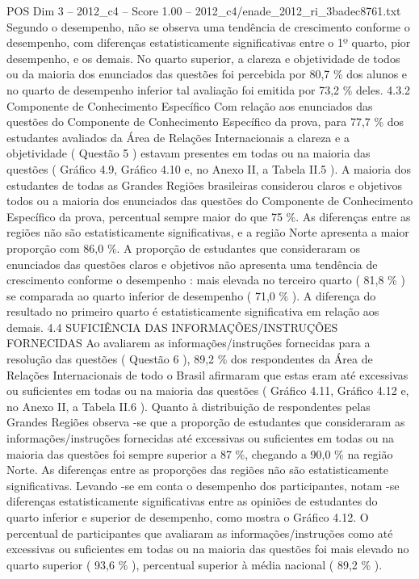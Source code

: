 \begin{textsample}{POS Dim 3 – 2012\_c4 – Score 1.00 – 2012\_c4/enade\_2012\_ri\_3badec8761.txt}
Segundo o desempenho, não se observa uma tendência de crescimento conforme o desempenho, com diferenças estatisticamente significativas entre o 1º quarto, pior desempenho, e os demais.
No quarto superior, a clareza e objetividade de todos ou da maioria dos enunciados das questões foi percebida por 80,7 \% dos alunos e no quarto de desempenho inferior tal avaliação foi emitida por 73,2 \% deles. 4.3.2 Componente de Conhecimento Específico Com relação aos enunciados das questões do Componente de Conhecimento Específico da prova, para 77,7 \% dos estudantes avaliados da Área de Relações Internacionais a clareza e a objetividade ( Questão 5 ) estavam presentes em todas ou na maioria das questões ( Gráfico 4.9, Gráfico 4.10 e, no Anexo II, a Tabela II.5 ).
A maioria dos estudantes de todas as Grandes Regiões brasileiras considerou claros e objetivos todos ou a maioria dos enunciados das questões do Componente de Conhecimento Específico da prova, percentual sempre maior do que 75 \%.
As diferenças entre as regiões não são estatisticamente significativas, e a região Norte apresenta a maior proporção com 86,0 \%.
A proporção de estudantes que consideraram os enunciados das questões claros e objetivos não apresenta uma tendência de crescimento conforme o desempenho : mais elevada no terceiro quarto ( 81,8 \% ) se comparada ao quarto inferior de desempenho ( 71,0 \% ).
A diferença do resultado no primeiro quarto é estatisticamente significativa em relação aos demais. 4.4 SUFICIÊNCIA DAS INFORMAÇÕES/INSTRUÇÕES FORNECIDAS Ao avaliarem as informações/instruções fornecidas para a resolução das questões ( Questão 6 ), 89,2 \% dos respondentes da Área de Relações Internacionais de todo o Brasil afirmaram que estas eram até excessivas ou suficientes em todas ou na maioria das questões ( Gráfico 4.11, Gráfico 4.12 e, no Anexo II, a Tabela II.6 ).
Quanto à distribuição de respondentes pelas Grandes Regiões observa -se que a proporção de estudantes que consideraram as informações/instruções fornecidas até excessivas ou suficientes em todas ou na maioria das questões foi sempre superior a 87 \%, chegando a 90,0 \% na região Norte.
As diferenças entre as proporções das regiões não são estatisticamente significativas.
Levando -se em conta o desempenho dos participantes, notam -se diferenças estatisticamente significativas entre as opiniões de estudantes do quarto inferior e superior de desempenho, como mostra o Gráfico 4.12.
O percentual de participantes que avaliaram as informações/instruções como até excessivas ou suficientes em todas ou na maioria das questões foi mais elevado no quarto superior ( 93,6 \% ), percentual superior à média nacional ( 89,2 \% ).

\end{textsample}
